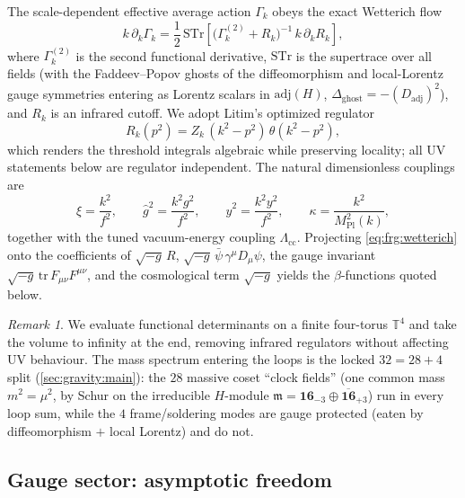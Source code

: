 \documentclass[11pt]{article}
\theoremstyle{plain}
\theoremstyle{definition}
\theoremstyle{remark}
\newtheorem{remark}[theorem]{Remark}
\begin{document}
The scale-dependent effective average action $\Gamma_{k}$ obeys the exact
Wetterich flow
\begin{equation}\label{eq:frg:wetterich}
  k\,\partial_{k}\Gamma_{k}
  =\frac12\,\mathrm{STr}\!\left[
    \bigl(\Gamma_{k}^{(2)}+R_{k}\bigr)^{-1}\,k\,\partial_{k}R_{k}\right],
\end{equation}
where $\Gamma_{k}^{(2)}$ is the second functional derivative, $\mathrm{STr}$
is the supertrace over all fields (with the Faddeev--Popov ghosts of the
diffeomorphism and local-Lorentz gauge symmetries entering as Lorentz
scalars in $\mathrm{adj}(H)$, $\Delta_{\mathrm{ghost}}=-(D_{\mathrm{adj}})^{2}$),
and $R_{k}$ is an infrared cutoff. We adopt Litim's optimized regulator
\begin{equation}\label{eq:frg:litim}
  R_{k}(p^{2})=Z_{k}\,(k^{2}-p^{2})\,\theta(k^{2}-p^{2}),
\end{equation}
which renders the threshold integrals algebraic while preserving locality;
all UV statements below are regulator independent. The natural
dimensionless couplings are
\begin{equation}\label{eq:frg:couplings}
  \xi=\frac{k^{2}}{f^{2}},\qquad
  \hat g^{2}=\frac{k^{2}g^{2}}{f^{2}},\qquad
  \hat y^{2}=\frac{k^{2}y^{2}}{f^{2}},\qquad
  \kappa=\frac{k^{2}}{M_{\mathrm{Pl}}^{2}(k)},
\end{equation}
together with the tuned vacuum-energy coupling $\Lambda_{\mathrm{cc}}$.
Projecting \eqref{eq:frg:wetterich} onto the coefficients of
$\sqrt{-g}\,R$, $\sqrt{-g}\,\bar\psi\,\gamma^{\mu}D_{\mu}\psi$, the gauge
invariant $\sqrt{-g}\,\mathrm{tr}\,F_{\mu\nu}F^{\mu\nu}$, and the cosmological
term $\sqrt{-g}$ yields the $\beta$-functions quoted below.

\begin{remark}
We evaluate functional determinants on a finite four-torus $\mathbb{T}^{4}$
and take the volume to infinity at the end, removing infrared regulators
without affecting UV behaviour. The mass spectrum entering the loops is the
locked $32=28+4$ split (\autoref{sec:gravity:main}): the $28$ massive coset
``clock fields'' (one common mass $m^{2}=\mu^{2}$, by Schur on the
irreducible $H$-module $\mathfrak{m}=\mathbf{16}_{-3}\oplus\overline{\mathbf{16}}_{+3}$)
run in every loop sum, while the $4$ frame/soldering modes are gauge
protected (eaten by diffeomorphism $+$ local Lorentz) and do not.
\end{remark}

\subsection{Gauge sector: asymptotic freedom}
\label{sec:frg:gauge}
\end{document}
